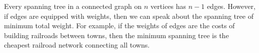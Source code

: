 

\setcounter{section}{2}
\setcounter{subsection}{6}
\setcounter{dfn}{15}

Every spanning tree in a connected graph on $n$ vertices has $n-1$ edges.
However, if edges are equipped with weights, then we can speak about the spanning tree of minimum total weight.
For example, if the weights of edges are the costs of building railroads between towns,
then the minimum spanning tree is the cheapest railroad network connecting all towns.



